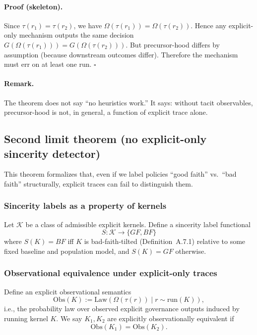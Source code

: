 \documentclass[preprints,article,submit,pdftex,moreauthors,accept]{Definitions/mdpi}
\begin{document}
\paragraph{Proof (skeleton).}
Since \(\tau(r_1)=\tau(r_2)\), we have \(\Omega(\tau(r_1))=\Omega(\tau(r_2))\). Hence any explicit-only mechanism outputs the same decision \(G(\Omega(\tau(r_1)))=G(\Omega(\tau(r_2)))\). But precursor-hood differs by assumption (because downstream outcomes differ). Therefore the mechanism must err on at least one run. \(\square\)

\paragraph{Remark.}
The theorem does not say ``no heuristics work.'' It says: without tacit observables, precursor-hood is not, in general, a function of explicit trace alone.

\subsection{Second limit theorem (no explicit-only sincerity detector)}
This theorem formalizes that, even if we label policies ``good faith'' vs.\ ``bad faith'' structurally, explicit traces can fail to distinguish them.

\subsubsection{Sincerity labels as a property of kernels}
Let \(\mathcal{K}\) be a class of admissible explicit kernels. Define a sincerity label functional
\[
S:\mathcal{K}\to \{GF,BF\}
\]
where \(S(K)=BF\) iff \(K\) is bad-faith-tilted (Definition~A.7.1) relative to some fixed baseline and population model, and \(S(K)=GF\) otherwise.

\subsubsection{Observational equivalence under explicit-only traces}
Define an explicit observational semantics
\[
\mathrm{Obs}(K) := \mathrm{Law}(\Omega(\tau(r)) \mid r\sim \text{run}(K)),
\]
i.e., the probability law over observed explicit governance outputs induced by running kernel \(K\).
We say \(K_1, K_2\) are explicitly observationally equivalent if
\[
\mathrm{Obs}(K_1)=\mathrm{Obs}(K_2).
\]
\end{document}

